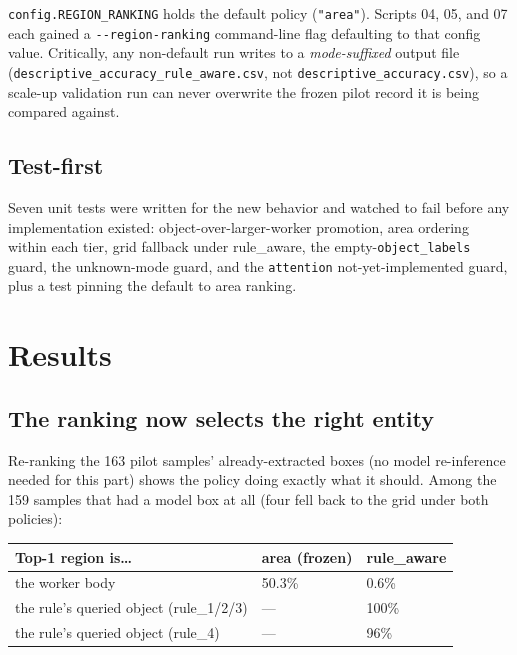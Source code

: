 \texttt{config.REGION\_RANKING} holds the default policy (\texttt{"area"}). Scripts 04, 05, and 07
each gained a \texttt{-{}-region-ranking} command-line flag defaulting to that config value. Critically,
any non-default run writes to a \emph{mode-suffixed} output file
(\texttt{descriptive\_accuracy\_rule\_aware.csv}, not \texttt{descriptive\_accuracy.csv}), so a
scale-up validation run can never overwrite the frozen pilot record it is being compared against.

\subsection{Test-first}

Seven unit tests were written for the new behavior and watched to fail before any implementation
existed: object-over-larger-worker promotion, area ordering within each tier, grid fallback under
rule\_aware, the empty-\texttt{object\_labels} guard, the unknown-mode guard, and the
\texttt{attention} not-yet-implemented guard, plus a test pinning the default to area ranking.

\section{Results}

\subsection{The ranking now selects the right entity}

Re-ranking the 163 pilot samples' already-extracted boxes (no model re-inference needed for this
part) shows the policy doing exactly what it should. Among the 159 samples that had a model box at
all (four fell back to the grid under both policies):

\begin{center}
\begin{tabular}{p{6.2cm}p{3.2cm}p{3.2cm}}
\toprule
\textbf{Top-1 region is\ldots} & \textbf{area (frozen)} & \textbf{rule\_aware} \\
\midrule
the worker body          & 50.3\% & 0.6\% \\
the rule's queried object (rule\_1/2/3) & --- & 100\% \\
the rule's queried object (rule\_4)     & --- & 96\% \\
\bottomrule
\end{tabular}
\label{tab:p11-entity}
\end{center}

